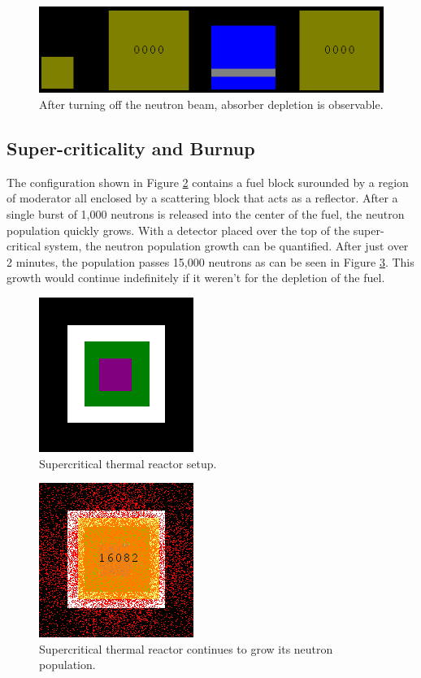 \documentclass{anstrans}
\begin{document}
\begin{figure}
    \centering
    \includegraphics[width=\columnwidth]{atten-off.png}
    \caption{After turning off the neutron beam, absorber depletion is observable.}
    \label{fig:atten-off}
\end{figure}

\subsection{Super-criticality and Burnup}

The configuration shown in Figure \ref{fig:thermal-setup} contains a fuel
block surounded by a region of moderator all enclosed by a scattering block
that acts as a reflector.  After a single burst of 1,000 neutrons is released
into the center of the fuel, the neutron population quickly grows.  With a
detector placed over the top of the super-critical system, the neutron
population growth can be quantified. After just over 2 minutes, the population
passes 15,000 neutrons as can be seen in Figure \ref{fig:thermal-on}.  This
growth would continue indefinitely if it weren't for the depletion of the
fuel.

\begin{figure}
    \centering
    \includegraphics{reactor-thermal-setup.png}
    \caption{Supercritical thermal reactor setup.}
    \label{fig:thermal-setup}
\end{figure}

\begin{figure}
    \centering
    \includegraphics{reactor-thermal-1min.png}
    \caption{Supercritical thermal reactor continues to grow its neutron population. }
    \label{fig:thermal-on}
\end{figure}
\end{document}
